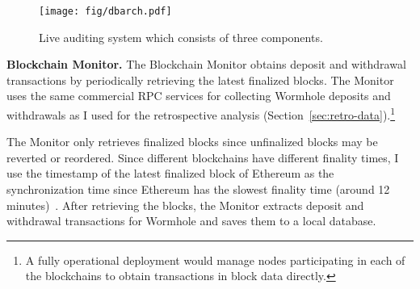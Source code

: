 \begin{figure}[t]
\centering
\texttt{[image: fig/dbarch.pdf]}
\caption[Live Auditing System Architecture]{Live auditing system which consists of three components.}
\label{fig:live-audit-arch}
\end{figure}

\textbf{Blockchain Monitor.}
%
The Blockchain Monitor obtains deposit and withdrawal transactions by
periodically retrieving the latest finalized blocks.  The Monitor
uses the same commercial RPC services for collecting
Wormhole deposits and withdrawals as I used for the retrospective
analysis (Section~\ref{sec:retro-data}).\footnote{A fully operational
deployment would manage nodes participating in each of the blockchains
to obtain transactions in block data directly.}

The Monitor only retrieves finalized blocks since unfinalized blocks
may be reverted or reordered.  Since different blockchains have
different finality times, I use the timestamp of the latest finalized
block of Ethereum as the synchronization time since Ethereum has the
slowest finality time (around 12 minutes)~\cite{Finality:online}.
After retrieving the blocks, the Monitor extracts deposit and
withdrawal transactions for Wormhole and saves them to a local
database.


